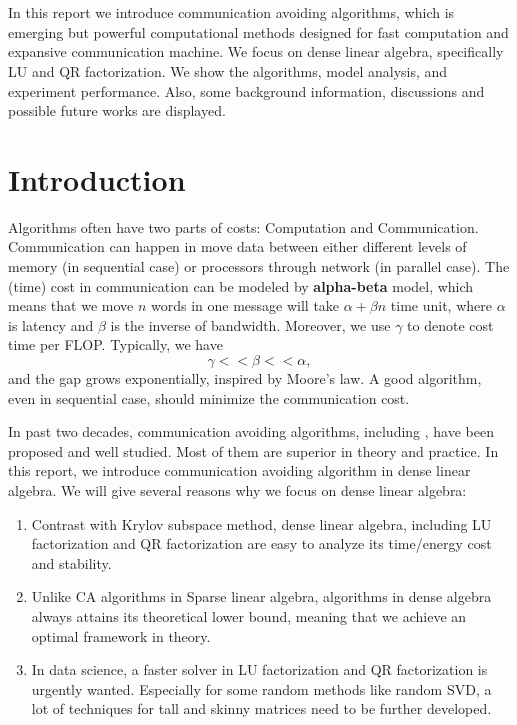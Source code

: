 \documentclass{article}
\begin{document}
	\maketitle
	\thispagestyle{fancy}
	\tableofcontents
	
	\section*{}
 In this report we introduce communication avoiding algorithms, which is emerging but powerful computational methods designed for fast computation and expansive communication machine. We focus on dense linear algebra, specifically LU and QR factorization. We show the algorithms, model analysis, and experiment performance. Also, some background information, discussions and possible future works are displayed.
 
 
 \section{Introduction}
 Algorithms often have two parts of costs: Computation and Communication. Communication can happen in move data between either different levels of memory (in sequential case) or processors through network (in parallel case). The (time) cost in communication can be modeled by \textbf{alpha-beta} model, which means that we move $n$ words in one message will take $\alpha + \beta n$ time unit, where $\alpha$ is latency and $\beta$ is the inverse of bandwidth. Moreover, we use $\gamma$ to denote cost time per FLOP. Typically, we have $$\gamma << \beta << \alpha,$$ and the gap grows exponentially, inspired by Moore's law. A good algorithm, even in sequential case, should minimize the communication cost.
 
 
In past two decades, communication avoiding algorithms, including \cite{demmel_communication-optimal_2012,grigori_introduction_nodate,ballard_communication_2014}, have been proposed and well studied. Most of them are superior in theory and practice. In this report, we introduce communication avoiding algorithm in dense linear algebra. We will give several reasons why we focus on dense linear algebra:
\begin{enumerate}
	\item Contrast with Krylov subspace method, dense linear algebra, including LU factorization and QR factorization are easy to analyze its time/energy cost and stability.
	\item Unlike CA algorithms in Sparse linear algebra, algorithms in dense algebra always attains its theoretical lower bound, meaning that we achieve an optimal framework in theory. 
	\item In data science, a faster solver in LU factorization and QR factorization is urgently wanted. Especially for some random methods like random SVD, a lot of techniques for tall and skinny matrices need to be further developed. 
\end{enumerate}
\end{document}
